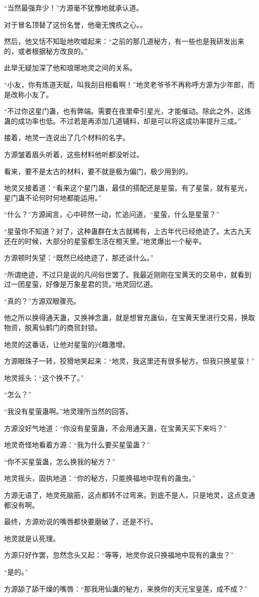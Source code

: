 \begin{this_body}
“当然最强弃少！”方源毫不犹豫地就承认道。

对于冒名顶替了这份名誉，他毫无愧疚之心。。

然后，他又恬不知耻地吹嘘起来：“之前的那几道秘方，有一些也是我研发出来的，或者根据秘方改良的。”

此举无疑加深了他和琅琊地灵之间的关系。

“小友，你有炼道天赋，叫我刮目相看啊！”地灵老爷爷不再称呼方源为少年郎，而是改称小友了。

“不过你这星门蛊，也有弊端。需要在夜里牵引星光，才能催动。除此之外，这炼蛊的成功率也低。不过若是再添加几道辅料，却是可以将这成功率提升三成。”

接着，地灵一连说出了几个材料的名字。

方源皱着眉头听着，这些材料他听都没听过。

看来，要不是太古的材料，要不就是极为偏门，极少用到的。

地灵又接着道：“看来这个星门蛊，最佳的搭配还是星萤。有了星萤，就有星光，星门蛊不论何时何地都能运用。”

“什么？”方源闻言，心中砰然一动，忙追问道，“星萤，什么是星萤？”

“星萤你不知道？对了，这种蛊群在太古就稀有，上古年代已经绝迹了。太古九天还在的时候，大部分的星萤都生活在橙天里。”地灵爆出一个秘辛。

方源顿时失望：“既然已经绝迹了，那还谈什么。”

“所谓绝迹，不过只是说的凡间俗世罢了。我最近刚刚在宝黄天的交易中，就看到过一团星萤，好像是万象星君的货。”地灵回忆道。

“真的？”方源双眼骤亮。

他之所以换得通天蛊，又换神念蛊，就是想冒充蛊仙，在宝黄天里进行交易，换取物资，脱离仙鹤门的商贸封锁。

地灵的这番话，让他对星萤的兴趣激增。

方源眼珠子一转，狡猾地笑起来：“地灵，我这里还有很多秘方。但我只换星萤！”

地灵摇头：“这个换不了。”

“怎么？”

“我没有星萤蛊啊。”地灵理所当然的回答。

方源没好气地道：“你没有星萤蛊，不会用通天蛊，在宝黄天买下来吗？”

地灵奇怪地看着方源：“我为什么要买星萤蛊？”

“你不买星萤蛊，怎么换我的秘方？”

地灵摇头，固执地道：“你的秘方，只能换福地中现有的蛊虫。”

方源无语了，地灵死脑筋，这点都转不过弯来。到底不是人，只是地灵，这点变通都没有啊。

最终，方源劝说的嘴唇都快要磨破了，还是不行。

地灵就是认死理。

方源只好作罢，忽然念头又起：“等等，地灵你说只换福地中现有的蛊虫？”

“是的。”

方源舔了舔干燥的嘴唇：“那我用仙蛊的秘方，来换你的天元宝皇莲，成不成？”

\end{this_body}

